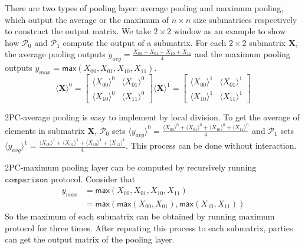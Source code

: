 \documentclass[letterpaper]{article} %
\begin{document}
    There are two types of pooling layer: average pooling and maximum pooling,
    which output the average or the maximum of $n\times n$ size submatrices respectively
    to construct the output matrix.
    We take $2\times 2$ window as an example to show how $\mathcal{P}_{0}$ and $\mathcal{P}_{1}$ compute the output of a submatrix.
    For each $2\times 2$ submatrix $\mathbf{X}$, the average pooling outputs $y_{avg}=\frac{X_{00}+ X_{01}+ X_{10}+  X_{11}}{4}$
    and the maximum pooling outputs $y_{max}=\mathsf{max}(X_{00}, X_{01}, X_{10},  X_{11})$.
    $$  \langle \mathbf{X}\rangle ^{0}= \begin{bmatrix}
        \langle X_{00}\rangle ^{0}& \langle X_{01}\rangle ^{0} \\
        \langle X_{10}\rangle ^{0}& \langle X_{11}\rangle ^{0}
       \end{bmatrix}\langle \mathbf{X}\rangle ^{1}=\begin{bmatrix}
        \langle X_{00}\rangle ^{1}& \langle X_{01}\rangle ^{1} \\
        \langle X_{10}\rangle ^{1}& \langle X_{11}\rangle ^{1}
       \end{bmatrix}$$

    2PC-average pooling is easy to implement by local division.
    To get the average of elements in submatrix $\mathbf{X}$,
    $\mathcal{P}_{0}$ sets $\langle y_{avg}\rangle^{0} = \frac{\langle X_{00}\rangle ^{0}+ \langle X_{01}\rangle ^{0}+
    \langle X_{10}\rangle ^{0}+ \langle X_{11}\rangle ^{0}}{4}$ and
    $\mathcal{P}_{1}$ sets $\langle y_{avg}\rangle^{1} = \frac{\langle X_{00}\rangle ^{1}+ \langle X_{01}\rangle ^{1}+
    \langle X_{10}\rangle ^{1}+ \langle X_{11}\rangle ^{1}}{4}$. This process can be done without interaction.

    2PC-maximum pooling layer can be computed by recursively running $\mathtt{comparison}$ protocol.
    Consider that
    \begin{align*}
        y_{max} &= \mathsf{max}(X_{00}, X_{01}, X_{10}, X_{11}) \\
        &= \mathsf{max}(\mathsf{max}(X_{00},X_{01}),\mathsf{max}( X_{10}, X_{11}))
    \end{align*}
    So the maximum of each submatrix can be obtained by running
    maximum protocol for three times.
    After repeating this process to each submatrix, parties can get the output matrix of the pooling layer.
\end{document}
